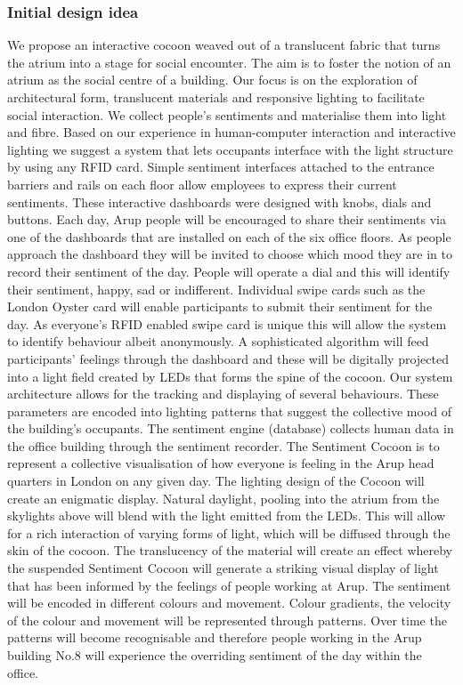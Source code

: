 \subsubsection{Initial design idea}

We propose an interactive cocoon weaved out of a translucent fabric that turns the atrium into a stage for social encounter. The aim is to foster the notion of an atrium as the social centre of a building. Our focus is on the exploration of architectural form, translucent materials and responsive lighting to facilitate social interaction. We collect people’s sentiments and materialise them into light and fibre.
Based on our experience in human-computer interaction and interactive lighting we suggest a system that lets occupants interface with the light structure by using any RFID card. Simple sentiment interfaces attached to the entrance barriers and rails on each floor allow employees to express their current sentiments. These interactive dashboards were designed with knobs, dials and buttons. Each day, Arup people will be encouraged to share their sentiments via one of the dashboards that are installed on each of the six office floors. As people approach the dashboard they will be invited to choose which mood they are in to record their sentiment of the day. People will operate a dial and this will identify their sentiment, happy, sad or indifferent. Individual swipe cards such as the London Oyster card will enable participants to submit their sentiment for the day. As everyone’s RFID enabled swipe card is unique this will allow the system to identify behaviour albeit anonymously. A sophisticated algorithm will feed participants’ feelings through the dashboard and these will be digitally projected into a light field created by LEDs that forms the spine of the cocoon.
Our system architecture allows for the tracking and displaying of several behaviours. These parameters are encoded into lighting patterns that suggest the collective mood of the building’s occupants. The sentiment engine (database) collects human data in the office building through the sentiment recorder. The Sentiment Cocoon is to represent a collective visualisation of how everyone is feeling in the Arup head quarters in London on any given day. 
The lighting design of the Cocoon will create an enigmatic display. Natural daylight, pooling into the atrium from the skylights above will blend with the light emitted from the LEDs. This will allow for a rich interaction of varying forms of light, which will be diffused through the skin of the cocoon. The translucency of the material will create an effect whereby the suspended Sentiment Cocoon will generate a striking visual display of light that has been informed by the feelings of people working at Arup.
The sentiment will be encoded in different colours and movement. Colour gradients, the velocity of the colour and movement will be represented through patterns. Over time the patterns will become recognisable and therefore people working in the Arup building No.8 will experience the overriding sentiment of the day within the office.

